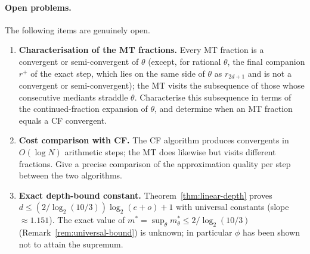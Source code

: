 \documentclass[12pt]{article}
\theoremstyle{definition}
\theoremstyle{remark}
\theoremstyle{plain}
\begin{document}
\paragraph{Open problems.}
The following items are genuinely open.
\begin{enumerate}
  \item \textbf{Characterisation of the MT fractions.}
    Every MT fraction is a convergent or semi-convergent of $\theta$ (except, for
    rational $\theta$, the final companion $r^+$ of the exact step, which lies on
    the same side of $\theta$ as $r_{2d+1}$ and is not a convergent or
    semi-convergent); the MT visits
    the subsequence of those whose consecutive mediants straddle $\theta$.
    Characterise this subsequence in terms of the continued-fraction expansion of
    $\theta$, and determine when an MT fraction equals a CF convergent.
  \item \textbf{Cost comparison with CF.}
    The CF algorithm produces convergents in $O(\log N)$ arithmetic steps; the MT does
    likewise but visits different fractions.
    Give a precise comparison of the approximation quality per step between the two
    algorithms.
  \item \textbf{Exact depth-bound constant.}
    Theorem~\ref{thm:linear-depth} proves $d \le (2/\log_2(10/3))\log_2(e+o)+1$
    with universal constants (slope $\approx 1.151$).
    The exact value of $m^* = \sup_\theta m^*_\theta \le 2/\log_2(10/3)$
    (Remark~\ref{rem:universal-bound}) is unknown; in particular
    $\phi$ has been shown not to attain the supremum.
\end{enumerate}
\end{document}

